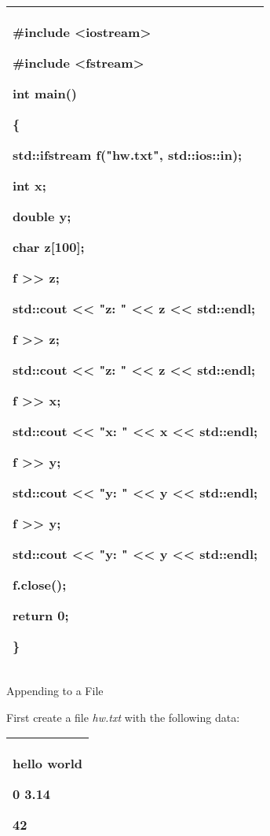 \documentclass[
]{article}
\begin{document}
\begin{longtable}[]{@{}l@{}}
\toprule
\endhead
\begin{minipage}[t]{0.97\columnwidth}\raggedright
\#include \textless iostream\textgreater{}

\#include \textless fstream\textgreater{}

int main()

\{

std::\textbf{ifstream} f("hw.txt", std::ios::\textbf{in});

int x;

double y;

char z{[}100{]};

f \textgreater\textgreater{} z;

std::cout \textless\textless{} "z: " \textless\textless{} z
\textless\textless{} std::endl;

f \textgreater\textgreater{} z;

std::cout \textless\textless{} "z: " \textless\textless{} z
\textless\textless{} std::endl;

f \textgreater\textgreater{} x;

std::cout \textless\textless{} "x: " \textless\textless{} x
\textless\textless{} std::endl;

f \textgreater\textgreater{} y;

std::cout \textless\textless{} "y: " \textless\textless{} y
\textless\textless{} std::endl;

f \textgreater\textgreater{} y;

std::cout \textless\textless{} "y: " \textless\textless{} y
\textless\textless{} std::endl;

f.close();

return 0;

\}\strut
\end{minipage}\tabularnewline
\bottomrule
\end{longtable}

Appending to a File

First create a file \emph{hw.txt} with the following data:

\begin{longtable}[]{@{}l@{}}
\toprule
\endhead
\begin{minipage}[t]{0.97\columnwidth}\raggedright
hello world

0 3.14

42\strut
\end{minipage}\tabularnewline
\bottomrule
\end{longtable}
\end{document}
